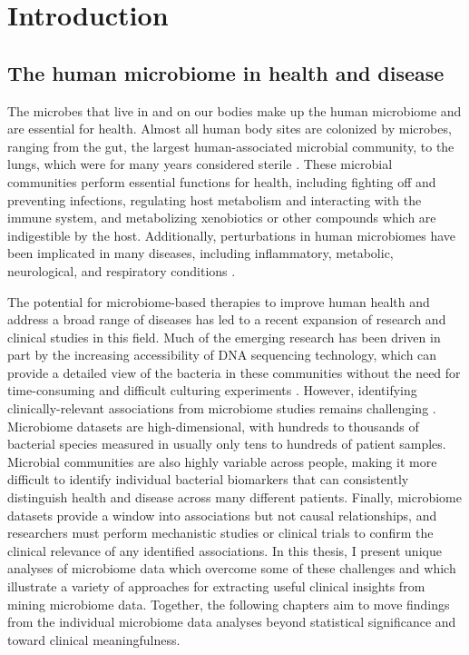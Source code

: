 
\chapter{Introduction}

\section{The human microbiome in health and disease}

The microbes that live in and on our bodies make up the human microbiome and are essential for health.
Almost all human body sites are colonized by microbes, ranging from the gut, the largest human-associated microbial community, to the lungs, which were for many years considered sterile \cite{sender-2016-bhratio,beck-2012-lungmicrobiome}.
These microbial communities perform essential functions for health, including fighting off and preventing infections, regulating host metabolism and interacting with the immune system, and metabolizing xenobiotics or other compounds which are indigestible by the host.
Additionally, perturbations in human microbiomes have been implicated in many diseases, including inflammatory, metabolic, neurological, and respiratory conditions \cite{beck-2012-lungmicrobiome,ibd-papa,ridaura-2013-obfmt,hsiao-2013-autism}.

The potential for microbiome-based therapies to improve human health and address a broad range of diseases has led to a recent expansion of research and clinical studies in this field.
Much of the emerging research has been driven in part by the increasing accessibility of DNA sequencing technology, which can provide a detailed view of the bacteria in these communities without the need for time-consuming and difficult culturing experiments \cite{hmp-2012}.
However, identifying clinically-relevant associations from microbiome studies remains challenging \cite{knights-2011-predictivevalue}.
Microbiome datasets are high-dimensional, with hundreds to thousands of bacterial species measured in usually only tens to hundreds of patient samples.
Microbial communities are also highly variable across people, making it more difficult to identify individual bacterial biomarkers that can consistently distinguish health and disease across many different patients.
Finally, microbiome datasets provide a window into associations but not causal relationships, and researchers must perform mechanistic studies or clinical trials to confirm the clinical relevance of any identified associations.
In this thesis, I present unique analyses of microbiome data which overcome some of these challenges and which illustrate a variety of approaches for extracting useful clinical insights from mining microbiome data.
Together, the following chapters aim to move findings from the individual microbiome data analyses beyond statistical significance and toward clinical meaningfulness.

